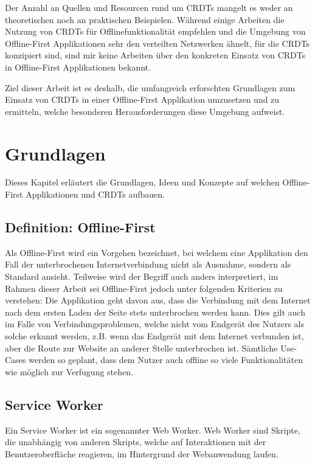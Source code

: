 \documentclass[a4paper, 12pt]{scrreprt}
\begin{document}
Der Anzahl an Quellen und Resourcen rund um CRDTs mangelt es weder an theoretischen noch an praktischen Beispielen. Während einige Arbeiten die Nutzung von CRDTs für Offlinefunktionalität empfehlen und die Umgebung von Offline-First Applikationen sehr den verteilten Netzwerken ähnelt, für die CRDTs konzipiert sind, sind mir keine Arbeiten über den konkreten Einsatz von CRDTs in Offline-First Applikationen bekannt.

Ziel dieser Arbeit ist es deshalb, die umfangreich erforschten Grundlagen zum Einsatz von CRDTs in einer Offline-First Applikation umzusetzen und zu ermitteln, welche besonderen Herausforderungen diese Umgebung aufweist.
\chapter{Grundlagen}
Dieses Kapitel erläutert die Grundlagen, Ideen und Konzepte auf welchen Offline-First Applikationen und CRDTs aufbauen. 
\section{Definition: Offline-First}\label{sec:DefinitionOfflineFirst}
Als Offline-First wird ein Vorgehen bezeichnet, bei welchem eine Applikation den Fall der unterbrochenen Internetverbindung nicht als Ausnahme, sondern als Standard ansieht. Teilweise wird der Begriff auch anders interpretiert, im Rahmen dieser Arbeit sei Offline-First jedoch unter folgenden Kriterien zu verstehen: Die Applikation geht davon aus, dass die Verbindung mit dem Internet nach dem ersten Laden der Seite stets unterbrochen werden kann. Dies gilt auch im Falle von Verbindungsproblemen, welche nicht vom Endgerät des Nutzers als solche erkannt werden, z.B. wenn das Endgerät mit dem Internet verbunden ist, aber die Route zur Website an anderer Stelle unterbrochen ist. Sämtliche Use-Cases werden so geplant, dass dem Nutzer auch offline so viele Funktionalitäten wie möglich zur Verfugung stehen.



\section{Service Worker}
\label{sec:serviceworker}

Ein Service Worker ist ein sogenannter Web Worker. Web Worker sind Skripte, die unabhängig von anderen Skripts, welche auf Interaktionen mit der Benutzeroberfläche reagieren, im Hintergrund der Webanwendung laufen\autocite{OnlineHTTPWorker}.
\end{document}
